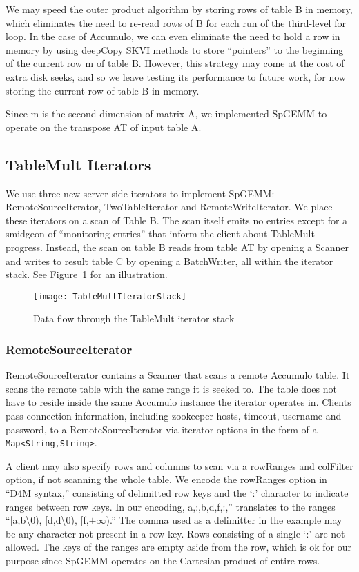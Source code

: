 We may speed the outer product algorithm by storing rows of table B in memory,
which eliminates the need to re-read rows of B for each run of the third-level for loop.
In the case of Accumulo, we can even eliminate the need to hold a row in memory by using
deepCopy SKVI methods to store ``pointers'' to the beginning of the current row m of table B.
However, this strategy may come at the cost of extra disk seeks, and so
we leave testing its performance to future work, for now storing the current row of table B in memory.

Since m is the second dimension of matrix A, we implemented SpGEMM to operate on the transpose AT of input table A.



\subsection{TableMult Iterators}
We use three new server-side iterators to implement SpGEMM: 
RemoteSourceIterator, TwoTableIterator and RemoteWriteIterator.
We place these iterators on a scan of Table B. The scan itself emits no 
entries except for a smidgeon of ``monitoring entries'' that inform the client 
about TableMult progress. Instead, the scan on table B reads from table AT
by opening a Scanner and writes to result table C
by opening a BatchWriter, all within the iterator stack.
See Figure~\ref{fIteratorStackSpGEMM} for an illustration.

\begin{figure}[htb]
\centering
\texttt{[image: TableMultIteratorStack]}
\caption{Data flow through the TableMult iterator stack}
\label{fIteratorStackSpGEMM}
\end{figure}

\subsubsection{RemoteSourceIterator}
RemoteSourceIterator contains a Scanner that scans a remote Accumulo table.  
It scans the remote table with the same range it is seeked to.
The table does not have to reside inside the same Accumulo instance the iterator
operates in. Clients pass connection information, including zookeeper hosts, timeout,
username and password, to a RemoteSourceIterator via iterator options
in the form of a \texttt{Map<String,String>}.

A client may also specify rows and columns to scan via a rowRanges and colFilter option, 
if not scanning the whole table. We encode the rowRanges option in ``D4M syntax,'' consisting of 
delimitted row keys and the `:' character to indicate ranges between row keys.
In our encoding, a,:,b,d,f,:,'' translates to the ranges 
``[a,b\textbackslash{}0), [d,d\textbackslash{}0), [f,$+\infty$).'' The comma used as a delimitter in the example 
may be any character not present in a row key.  Rows consisting of a single `:' are not allowed.
The keys of the ranges are empty aside from the row, which is ok for our purpose since SpGEMM
operates on the Cartesian product of entire rows.

